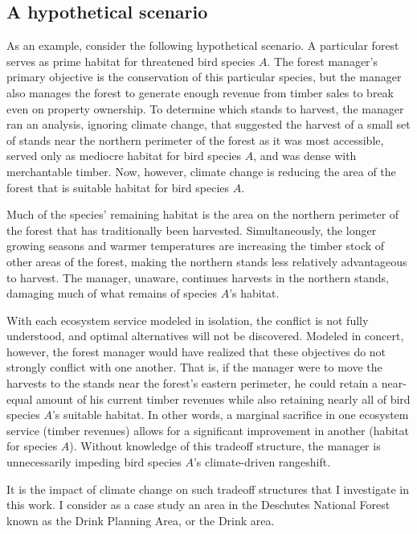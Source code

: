 \subsection{A hypothetical scenario}
As an example, consider the following hypothetical scenario. A particular forest serves as prime habitat for threatened bird species $A$. The forest manager's primary objective is the conservation of this particular species, but the manager also manages the forest to generate enough revenue from timber sales to break even on property ownership.  To determine which stands to harvest, the manager ran an analysis, ignoring climate change, that suggested the harvest of a small set of stands near the northern perimeter of the forest as it was most accessible, served only as mediocre habitat for bird species $A$, and was dense with merchantable timber. Now, however, climate change is reducing the area of the forest that is suitable habitat for bird species $A$.

Much of the species' remaining habitat is the area on the northern perimeter of the forest that has traditionally been harvested. Simultaneously, the longer growing seasons and warmer temperatures are increasing the timber stock of other areas of the forest, making the northern stands less relatively advantageous to harvest. The manager, unaware, continues harvests in the northern stands, damaging much of what remains of species $A$'s habitat.

With each ecosystem service modeled in isolation, the conflict is not fully understood, and optimal alternatives will not be discovered. Modeled in concert, however, the forest manager would have realized that these objectives do not strongly conflict with one another. That is, if the manager were to move the harvests to the stands near the forest's eastern perimeter, he could retain a near-equal amount of his current timber revenues while also retaining nearly all of bird species $A$'s suitable habitat. In other words, a marginal sacrifice in one ecosystem service (timber revenues) allows for a significant improvement in another (habitat for species $A$). Without knowledge of this tradeoff structure, the manager is unnecessarily impeding bird species $A$'s climate-driven rangeshift.

It is the impact of climate change on such tradeoff structures that I investigate in this work. I consider as a case study an area in the Deschutes National Forest known as the Drink Planning Area, or the Drink area.